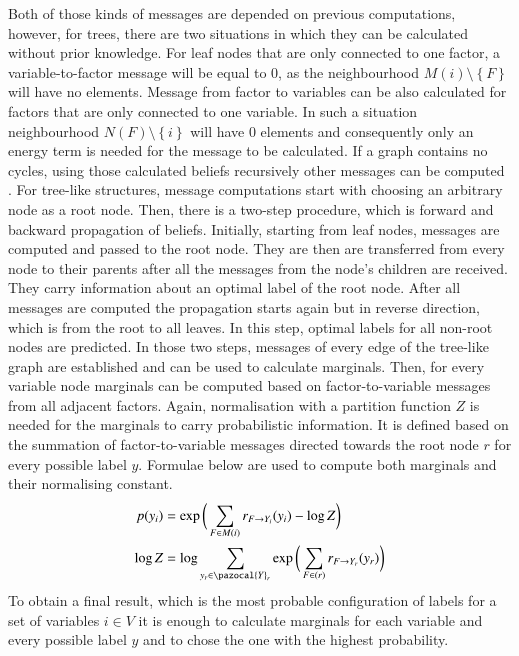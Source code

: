 Both of those kinds of messages are depended on previous computations, however, for trees, there are two situations in which they can be calculated without prior knowledge. For leaf nodes that are only connected to one factor, a variable-to-factor message will be equal to 0, as the neighbourhood $M(i)\setminus{\left \{ F \right \}}$ will have no elements. Message from factor to variables can be also calculated for factors that are only connected to one variable. In such a situation neighbourhood $N(F)\setminus{\left \{ i \right \}}$ will have 0 elements and consequently only an energy term is needed for the message to be calculated. If a graph contains no cycles, using those calculated beliefs recursively other messages can be computed \cite{lbp}. For tree-like structures, message computations start with choosing an arbitrary node as a root node. Then, there is a two-step procedure, which is forward and backward propagation of beliefs. Initially, starting from leaf nodes, messages are computed and passed to the root node. They are then are transferred from every node to their parents after all the messages from the node’s children are received. They carry information about an optimal label of the root node. After all messages are computed the propagation starts again but in reverse direction, which is from the root to all leaves. In this step, optimal labels for all non-root nodes are predicted. In those two steps, messages of every edge of the tree-like graph are established and can be used to calculate marginals. Then, for every variable node marginals can be computed based on factor-to-variable messages from all adjacent factors. Again, normalisation with a partition function $Z$ is needed for the marginals to carry probabilistic information. It is defined based on the summation of factor-to-variable messages directed towards the root node $r$ for every possible label $y$. Formulae below are used to compute both marginals and their normalising constant.
\begin{align}
    p(y_i) &= \exp{\bigg(\sum_{F \in M(i)}{r_{F\rightarrow Y_i}(y_i)} - \log{Z}\bigg)} \\
    \log{Z} &= \log{\sum_{y_r \in \pazocal{Y}_r}{
         \exp{\bigg(\sum_{F \in (r)}{r_{F\rightarrow Y_r}(y_r)}\bigg)
     }}}
\end{align}
To obtain a final result, which is the most probable configuration of labels for a set of variables $i \in V$ it is enough to calculate marginals for each variable and every possible label $y$ and to chose the one with the highest probability.

